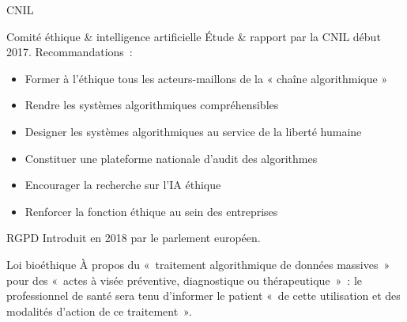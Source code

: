 \begin{frame}{CNIL}
\end{frame}

\begin{frame}{Comité éthique \& intelligence artificielle}
  Étude \& rapport par la CNIL début 2017. Recommandations~:
  \begin{itemize}[<+->]
    \item Former à l’éthique tous les acteurs-maillons de la « chaîne algorithmique » 
    \item Rendre les systèmes algorithmiques compréhensibles
    \item Designer les systèmes algorithmiques au service de la liberté humaine
    \item Constituer une plateforme nationale d’audit des algorithmes
    \item Encourager la recherche sur l’IA éthique
    \item Renforcer la fonction éthique au sein des entreprises
  \end{itemize}
\end{frame}

\begin{frame}{RGPD}
  Introduit en 2018 par le parlement européen.
\end{frame}

\begin{frame}{Loi bioéthique}
  À propos du «~traitement algorithmique de données massives~» pour des «~actes à visée préventive, diagnostique ou thérapeutique~»~: le professionnel de santé sera tenu d'informer le patient «~de cette utilisation et des modalités d’action de ce traitement~».
\end{frame}
